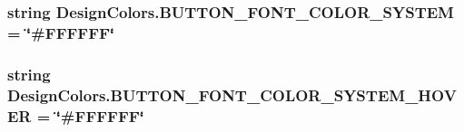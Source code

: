 \subsubsection[{\texorpdfstring{B\+U\+T\+T\+O\+N\+\_\+\+F\+O\+N\+T\+\_\+\+C\+O\+L\+O\+R\+\_\+\+S\+Y\+S\+T\+EM}{BUTTON_FONT_COLOR_SYSTEM}}]{\setlength{\rightskip}{0pt plus 5cm}string Design\+Colors.\+B\+U\+T\+T\+O\+N\+\_\+\+F\+O\+N\+T\+\_\+\+C\+O\+L\+O\+R\+\_\+\+S\+Y\+S\+T\+EM = \char`\"{}\#F\+F\+F\+F\+FF\char`\"{}}\hypertarget{namespaceDesignColors_abd5b7c8c991d968b7fdc9232feef7b0b}{}\label{namespaceDesignColors_abd5b7c8c991d968b7fdc9232feef7b0b}
\subsubsection[{\texorpdfstring{B\+U\+T\+T\+O\+N\+\_\+\+F\+O\+N\+T\+\_\+\+C\+O\+L\+O\+R\+\_\+\+S\+Y\+S\+T\+E\+M\+\_\+\+H\+O\+V\+ER}{BUTTON_FONT_COLOR_SYSTEM_HOVER}}]{\setlength{\rightskip}{0pt plus 5cm}string Design\+Colors.\+B\+U\+T\+T\+O\+N\+\_\+\+F\+O\+N\+T\+\_\+\+C\+O\+L\+O\+R\+\_\+\+S\+Y\+S\+T\+E\+M\+\_\+\+H\+O\+V\+ER = \char`\"{}\#F\+F\+F\+F\+FF\char`\"{}}\hypertarget{namespaceDesignColors_a7b473b0f7a1e94ba117b66725bd28d78}{}\label{namespaceDesignColors_a7b473b0f7a1e94ba117b66725bd28d78}
